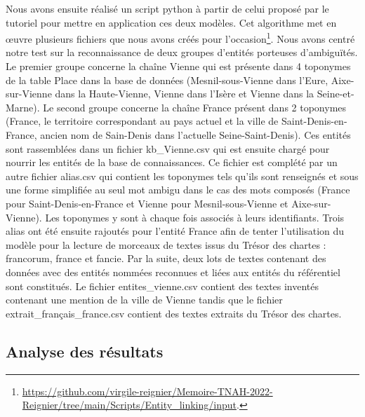 \documentclass[a4paper,12pt,twoside]{book}
\begin{document}
	Nous avons ensuite réalisé un script python à partir de celui proposé par le tutoriel pour mettre en application ces deux modèles. Cet algorithme met en œuvre plusieurs fichiers que nous avons créés pour l'occasion\footnote{\url{https://github.com/virgile-reignier/Memoire-TNAH-2022-Reignier/tree/main/Scripts/Entity_linking/input}.}. Nous avons centré notre test sur la reconnaissance de deux groupes d'entités porteuses d'ambiguïtés. Le premier groupe concerne la chaîne \og Vienne\fg{} qui est présente dans 4 toponymes de la table Place dans la base de données (Mesnil-sous-Vienne dans l'Eure, Aixe-sur-Vienne dans la Haute-Vienne, Vienne dans l'Isère et Vienne dans la Seine-et-Marne). Le second groupe concerne la chaîne \og France\fg{} présent dans 2 toponymes (France, le territoire correspondant au pays actuel et la ville de Saint-Denis-en-France, ancien nom de Sain-Denis dans l'actuelle Seine-Saint-Denis). Ces entités sont rassemblées dans un fichier \og kb\_Vienne.csv\fg{} qui est ensuite chargé pour nourrir les entités de la base de connaissances. Ce fichier est complété par un autre fichier \og alias.csv\fg{} qui contient les toponymes tels qu'ils sont renseignés et sous une forme simplifiée au seul mot ambigu dans le cas des mots composés (\og France\fg{} pour Saint-Denis-en-France et \og Vienne\fg{} pour Mesnil-sous-Vienne et Aixe-sur-Vienne). Les toponymes y sont à chaque fois associés à leurs identifiants. Trois alias ont été ensuite rajoutés pour l'entité France afin de tenter l'utilisation du modèle pour la lecture de morceaux de textes issus du Trésor des chartes : \og francorum\fg{}, \og france\fg{} et \og fancie\fg{}. Par la suite, deux lots de textes contenant des données avec des entités nommées reconnues et liées aux entités du référentiel sont constitués. Le fichier \og 	entites\_vienne.csv\fg{} contient des textes inventés contenant une mention de la ville de Vienne tandis que le fichier \og extrait\_français\_france.csv\fg{} contient des textes extraits du Trésor des chartes.
	
	\subsection{Analyse des résultats}
	
\end{document}
